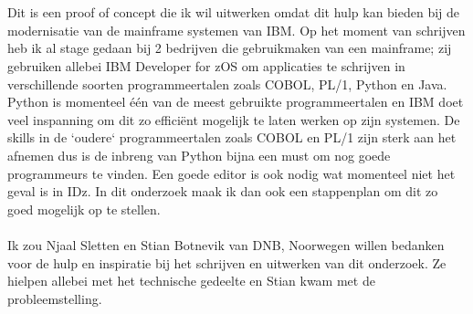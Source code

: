 
\chapter*{}%
\label{ch:voorwoord}


Dit is een proof of concept die ik wil uitwerken omdat dit hulp kan bieden bij de modernisatie van de mainframe systemen van IBM. Op het moment van schrijven heb ik al stage gedaan bij 2 bedrijven die gebruikmaken van een mainframe; zij gebruiken allebei IBM Developer for zOS om applicaties te schrijven in verschillende soorten programmeertalen zoals COBOL, PL/1, Python en Java. Python is momenteel één van de meest gebruikte programmeertalen en IBM doet veel inspanning om dit zo efficiënt mogelijk te laten werken op zijn systemen. De skills in de `oudere` programmeertalen zoals COBOL en PL/1 zijn sterk aan het afnemen dus is de inbreng van Python bijna een must om nog goede programmeurs te vinden. Een goede editor is ook nodig wat momenteel niet het geval is in IDz. In dit onderzoek maak ik dan ook een stappenplan om dit zo goed mogelijk op te stellen.
\\ \\
Ik zou Njaal Sletten en Stian Botnevik van DNB, Noorwegen willen bedanken voor de hulp en inspiratie bij het schrijven en uitwerken van dit onderzoek. Ze hielpen allebei met het technische gedeelte en Stian kwam met de probleemstelling.